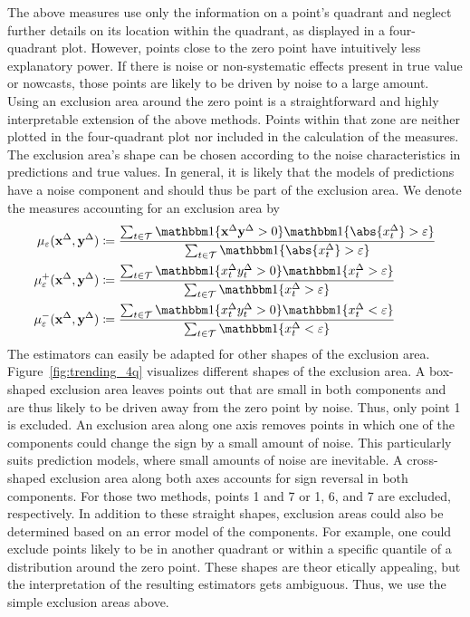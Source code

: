 The above measures use only the information on a point's quadrant and neglect further details on its location within the quadrant, as displayed in a four-quadrant plot.
However, points close to the zero point have intuitively less explanatory power.
If there is noise or non-systematic effects present in true value or nowcasts, those points are likely to be driven by noise to a large amount. 
Using an exclusion area around the zero point is a straightforward and highly interpretable extension of the above methods.
Points within that zone are neither plotted in the four-quadrant plot nor included in the calculation of the measures.
The exclusion area's shape can be chosen according to the noise characteristics in predictions and true values.
In general, it is likely that the models of predictions have a noise component and should thus be part of the exclusion area.
We denote the measures accounting for an exclusion area by
\begin{align}
    \acceps (\diffx, \diffy) &\coloneqq \frac{\sum_{t \in \mathcal{T}} \ind{\diffx \diffy > 0} \ind{\abs{\diffxt} > \varepsilon}}{\sum_{t \in \mathcal{T}} \ind{\abs{\diffxt} > \varepsilon}}\label{eq:acceps}\\
    \accpeps (\diffx, \diffy) &\coloneqq \frac{\sum_{t \in \mathcal{T}} \ind{\diffxt \diffyt > 0} \ind{\diffxt > \varepsilon}}{\sum_{t \in \mathcal{T}} \ind{\diffxt > \varepsilon}} \label{eq:accpeps}\\
    \accmeps (\diffx, \diffy) &\coloneqq \frac{\sum_{t \in \mathcal{T}} \ind{\diffxt \diffyt > 0} \ind{\diffxt < \varepsilon}}{\sum_{t \in \mathcal{T}} \ind{\diffxt < \varepsilon }}\label{eq:accmeps}
\end{align}
The estimators can easily be adapted for other shapes of the exclusion area.
Figure~\ref{fig:trending_4q} visualizes different shapes of the exclusion area.
A box-shaped exclusion area leaves points out that are small in both components and are thus likely to be driven away from the zero point by noise.
Thus, only point 1 is excluded.
An exclusion area along one axis removes points in which one of the components could change the sign by a small amount of noise.
This particularly suits prediction models, where small amounts of noise are inevitable.
A cross-shaped exclusion area along both axes accounts for sign reversal in both components.
For those two methods, points 1 and 7 or 1, 6, and 7 are excluded, respectively.
In addition to these straight shapes, exclusion areas could also be determined based on an error model of the components.
For example, one could exclude points likely to be in another quadrant or within a specific quantile of a distribution around the zero point. 
These shapes are theor etically appealing, but the interpretation of the resulting estimators gets ambiguous.
Thus, we use the simple exclusion areas above.

